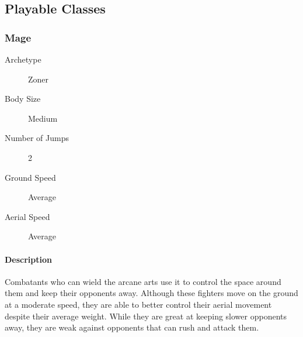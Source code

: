 \subsection{Playable Classes}

\subsubsection{Mage}

\begin{description}
    \item[Archetype] Zoner
    \item[Body Size] Medium
    \item[Number of Jumps] 2
    \item[Ground Speed] Average
    \item[Aerial Speed] Average    
\end{description}

\paragraph{Description} Combatants who can wield the arcane arts use it to control the space around them and keep their opponents away. Although these fighters move on the ground at a moderate speed, they are able to better control their aerial movement despite their average weight. While they are great at keeping slower opponents away, they are weak against opponents that can rush and attack them.

